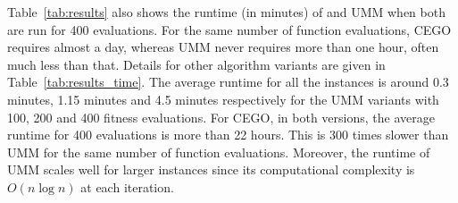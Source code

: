 \documentclass[sigconf,dvipsnames]{acmart}
\begin{document}
%
Table~\ref{tab:results} also shows the runtime (in minutes) of \CEGOinv and UMM when both
are run for 400 evaluations. For the same number of function evaluations, CEGO requires almost a day, whereas UMM
never requires more than one hour, often much less than that.
%
Details for other algorithm variants are given in Table~\ref{tab:results_time}.
The average runtime for all the instances is around 0.3 minutes, 1.15 minutes
and 4.5 minutes respectively for the UMM variants with 100, 200 and 400 fitness
evaluations.  For CEGO, in both versions, the average runtime for 400
evaluations is more than 22 hours. This is 300 times slower than UMM for the
same number of function evaluations.  Moreover, the runtime of UMM scales well
for larger instances since its computational complexity  is $O(n \log n)$ at
each iteration.
\end{document}
